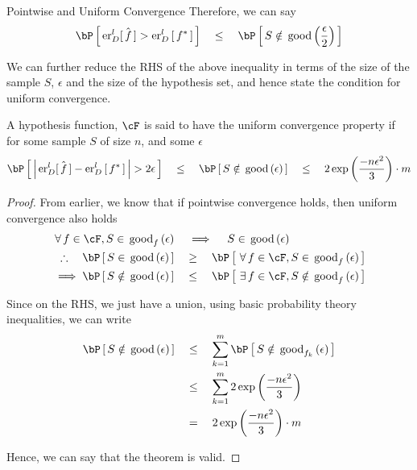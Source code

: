 \documentclass{article}
\begin{document}
\begin{ssection}{Pointwise and Uniform Convergence}
	Therefore, we can say
	\begin{align*}
		\prob{\errs[_D^l]{f} > \err[_D^l]{f^\ast}}	\qle	\prob{S \notin \tfunc{good}{\frac{\epsilon}{2}}}
	\end{align*} \sbr

	We can further reduce the RHS of the above inequality in terms of the size of the sample $S$, $\epsilon$ and the size of the hypothesis set, and hence state the condition for uniform convergence.

	\begin{theorem} A hypothesis function, $\cF$ is said to have the uniform convergence property if for some sample $S$ of size $n$, and some $\epsilon$
		\begin{align*}
			\prob{\abs{\errs[_D^l]{f} - \err[_D^l]{f^\ast}} > 2 \epsilon}	\qle	\prob{S \notin \tfunc{good}{\epsilon}}	\qle	2 \texp{\frac{-n \epsilon^2}{3}} \cdot m
		\end{align*}
	\end{theorem}
	\begin{proof}
		From earlier, we know that if pointwise convergence holds, then uniform convergence also holds
		\begin{align*}
			\qforall f \in \cF, S \in \tfunc[f]{good}{\epsilon}		&\qimplies	S \in \tfunc{good}{\epsilon} \\
			\therefore \quad \prob{S \in \tfunc{good}{\epsilon}}	&\qge		\prob{\qforall f \in \cF, S \in \tfunc[f]{good}{\epsilon}} \\
			\implies \prob{S \notin \tfunc{good}{\epsilon}}			&\qle		\prob{\qexists f \in \cF, S \notin \tfunc[f]{good}{\epsilon}}
		\end{align*}

		Since on the RHS, we just have a union, using basic probability theory inequalities, we can write
		\begin{align*}
			\prob{S \notin \tfunc{good}{\epsilon}}	&\qle	\sum_{k = 1}^m \prob{S \notin \tfunc[f_k]{good}{\epsilon}} \\
													&\qle	\sum_{k = 1}^m 2 \texp{\frac{-n\epsilon^2}{3}} \\
													&\eq	2 \texp{\frac{-n\epsilon^2}{3}} \cdot m
		\end{align*}

		Hence, we can say that the theorem is valid.
	\end{proof}


\end{ssection}
\end{document}
